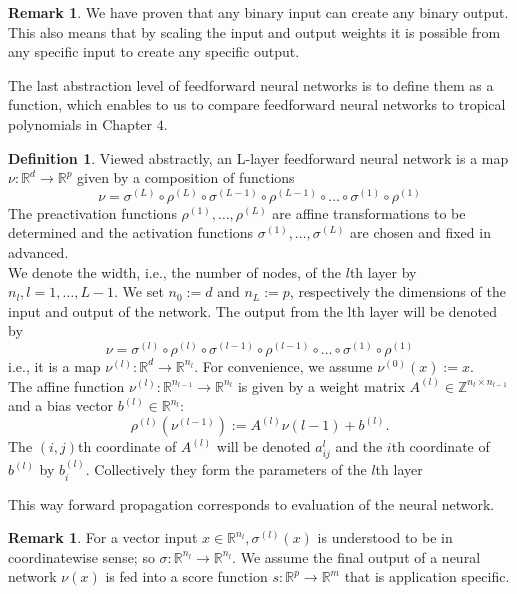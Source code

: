 \documentclass{article}
\theoremstyle{definition}
\newtheorem{definition}[theorem]{Definition}
\newtheorem{remark}[theorem]{Remark}
\begin{document}
\begin{remark}
We have proven that any binary input can create any binary output. This also means that by scaling the input and output weights it is possible from any specific input to create any specific output.

\end{remark}

The last abstraction level of feedforward neural networks is to define them as a function, which enables to us to compare feedforward neural networks to tropical polynomials in Chapter $4$.

\begin{definition}\cite{zhang2018tropical}
Viewed abstractly, an L-layer feedforward neural network is a map $\nu : \mathbb{R}^{d} \to \mathbb{R}^{p}$ given by a composition of functions
$$ \nu = \sigma^{(L)} \circ \rho^{(L)} \circ \sigma^{(L-1)} \circ \rho^{(L-1)} \circ \dots \circ \sigma^{(1)} \circ \rho^{(1)}$$
The preactivation functions $\rho^{(1)}, \dots , \rho^{(L)}$ are affine transformations to be determined and the activation functions $\sigma^{(1)}, \dots , \sigma^{(L)}$ are chosen and fixed in advanced. \\
We denote the width, i.e., the number of nodes, of the $l$th
layer by $n_l, l = 1, \dots , L-1$. We set $n_0 := d$ and $n_L := p$, respectively the dimensions of the input and output of the network. The output from the lth layer will be denoted by
$$\nu = \sigma^{(l)} \circ \rho^{(l)} \circ \sigma^{(l-1)} \circ \rho^{(l-1)} \circ \dots \circ \sigma^{(1)} \circ \rho^{(1)}$$
i.e., it is a map $\nu^{(l)} : \mathbb{R}^{d} \to \mathbb{R}^{n_l}$. For convenience, we assume $\nu^{(0)}(x) := x$. \\
The affine function $\nu^{(l)} : \mathbb{R}^{n_{l-1}} \to \mathbb{R}^{n_{l}}$ is given by a weight matrix $A^{(l)} \in \mathbb{Z}^{n_l \times n_{l-1}} $ and a bias vector $b^{(l)} \in \mathbb{R}^{n_l}$:
$$ \rho^{(l)}(\nu^{(l-1)}) := A^{(l)} \nu{(l-1)} + b^{(l)}. $$
The $(i, j)$th coordinate of $A^{(l)}$ will be denoted $a^{l}_{ij}$ and the $i$th coordinate of $b^{(l)}$ by $b^{(l)}_{i}$. Collectively they form the parameters of the $l$th layer
\end{definition}

This way forward propagation corresponds to evaluation of the neural network.

\begin{remark}\cite{zhang2018tropical}
For a vector input $x \in \mathbb{R}^{n_l}, \sigma^{(l)}(x)$ is understood to be in coordinatewise sense; so $\sigma : \mathbb{R}^{n_l} \to \mathbb{R}^{n_l}$. We assume the
final output of a neural network $\nu(x)$ is fed into a score function $s : \mathbb{R}^{p} \to \mathbb{R}^{m}$ that is application specific.
\end{remark}
\end{document}
